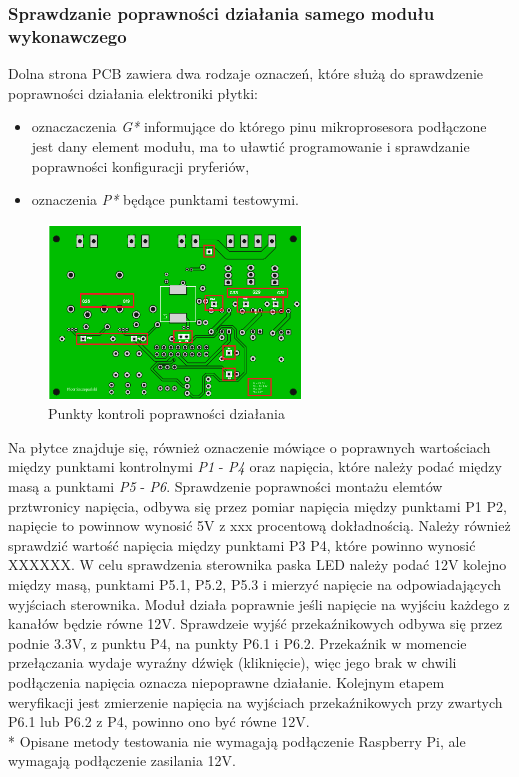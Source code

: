 \documentclass[12pt, eng, twoside, openany, final]{mgr}
\begin{document}
            \subsubsection{Sprawdzanie poprawności działania samego modułu wykonawczego}
            Dolna strona PCB zawiera dwa rodzaje oznaczeń, które służą do sprawdzenie poprawności działania elektroniki płytki:
            \begin{itemize}
                \item oznaczaczenia \emph{G*} informujące do którego pinu mikroprosesora podłączone jest dany element modułu, ma to uławtić programowanie i sprawdzanie poprawności konfiguracji pryferiów,
                \item oznaczenia \emph{P*} będące punktami testowymi.
            \end{itemize}
               \begin{figure}[H]
                \begin{center}
                    \includegraphics[width=0.6\textwidth]{pcb_dol_zaz.png}
                    \caption{Punkty kontroli poprawności działania}
                \end{center}
                \end{figure}
            Na płytce znajduje się, również oznaczenie mówiące o poprawnych wartościach między punktami kontrolnymi \emph{P1} - \emph{P4} oraz napięcia, które należy podać między masą a punktami \emph{P5} - \emph{P6}.
            Sprawdzenie poprawności montażu elemtów prztwronicy napięcia, odbywa się przez pomiar napięcia między punktami P1 P2, napięcie to powinnow wynosić 5V z xxx procentową dokładnością.
            Należy również sprawdzić wartość napięcia między punktami P3 P4, które powinno wynosić XXXXXX.
            W celu sprawdzenia sterownika paska LED należy podać 12V kolejno między masą, punktami P5.1, P5.2, P5.3 i mierzyć napięcie na odpowiadających wyjściach sterownika. Moduł działa poprawnie jeśli napięcie na wyjściu każdego z kanałów będzie równe 12V.
            Sprawdzeie wyjść przekaźnikowych odbywa się przez podnie 3.3V, z punktu P4, na punkty P6.1 i P6.2.
            Przekaźnik w momencie przełączania wydaje wyraźny dźwięk (kliknięcie), więc jego brak w chwili podłączenia napięcia oznacza niepoprawne działanie. Kolejnym etapem weryfikacji jest zmierzenie napięcia na wyjściach przekaźnikowych przy zwartych P6.1 lub P6.2 z P4, powinno ono być równe 12V.
            \\* Opisane metody testowania nie wymagają podłączenie Raspberry Pi, ale wymagają podłączenie zasilania 12V. 
            
\end{document}
